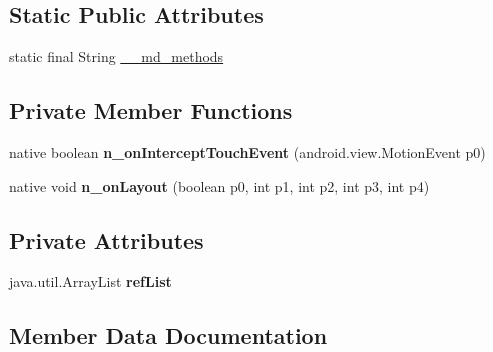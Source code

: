 \subsection*{Static Public Attributes}
\begin{DoxyCompactItemize}
\item 
static final String \hyperlink{classmd5b60ffeb829f638581ab2bb9b1a7f4f3f_1_1MasterDetailContainer_a556c7fb30e166beeb9cd843dea89366f}{\+\_\+\+\_\+md\+\_\+methods}
\end{DoxyCompactItemize}
\subsection*{Private Member Functions}
\begin{DoxyCompactItemize}
\item 
\mbox{\label{classmd5b60ffeb829f638581ab2bb9b1a7f4f3f_1_1MasterDetailContainer_a843262038a60f2af2bbb4c867c0a0641}} 
native boolean {\bfseries n\+\_\+on\+Intercept\+Touch\+Event} (android.\+view.\+Motion\+Event p0)
\item 
\mbox{\label{classmd5b60ffeb829f638581ab2bb9b1a7f4f3f_1_1MasterDetailContainer_aa4ea06195f50a84c96f5163df0e39faa}} 
native void {\bfseries n\+\_\+on\+Layout} (boolean p0, int p1, int p2, int p3, int p4)
\end{DoxyCompactItemize}
\subsection*{Private Attributes}
\begin{DoxyCompactItemize}
\item 
\mbox{\label{classmd5b60ffeb829f638581ab2bb9b1a7f4f3f_1_1MasterDetailContainer_ab2c4d24cca5bde061bd6ca0b037af523}} 
java.\+util.\+Array\+List {\bfseries ref\+List}
\end{DoxyCompactItemize}


\subsection{Member Data Documentation}
\mbox{\label{classmd5b60ffeb829f638581ab2bb9b1a7f4f3f_1_1MasterDetailContainer_a556c7fb30e166beeb9cd843dea89366f}} 
